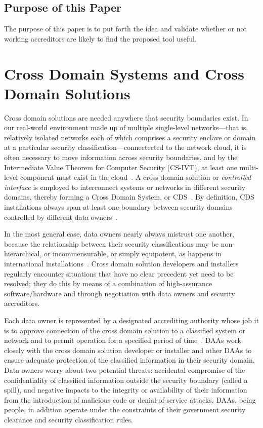 \documentclass{llncs}
\begin{document}
\subsection{Purpose of this Paper}

The purpose of this paper
is to put forth the idea and validate whether or not working accreditors
are likely to find the proposed tool useful.

\section{Cross Domain Systems and Cross Domain Solutions}

Cross domain solutions are needed anywhere that security boundaries exist.
In our real-world environment made up of multiple single-level networks---that is,
relatively isolated networks each of which comprises a security enclave or
domain at a particular security classification---connectected to the
network cloud, it is often necessary to move information across security
boundaries, and by the Intermediate Value Theorem for Computer Security (CS-IVT),
at least one multi-level component must exist in the
cloud~\cite[]{Bell2005b}.  A cross domain solution or
\emph{controlled interface} is employed to interconnect systems or networks
in different security domains, thereby forming a Cross Domain System,
or CDS~\cite{DCID-6/3a}.
By definition, CDS installations always span at least one boundary between
security domains controlled by different data owners~\cite{Loughry2010a}.

In the most general case, data owners nearly always mistrust one another,
because the relationship between their security classifications may be
non-hierarchical, or incommensurable, or simply equipotent, as happens in
international
installations~\cite{TSOL_2.5_CMW}.  Cross domain solution developers and installers regularly
encounter situations that have no clear precedent yet need to be resolved;
they do this by means of a combination of high-assurance
software/hardware and through negotiation with data owners and security accreditors.

Each data owner is represented by a designated accrediting authority
whose job it is to approve connection of the cross domain solution to
a classified system or network and to permit operation for a specified period of
time~\cite{NIST-SP-800-37,NIST-SP-800-53A2,DIACAP,NIST-SP800-53r3}.
DAAs work closely with the cross domain solution developer or installer and other DAAs to ensure
adequate protection of the classified information in their security domain.
Data owners worry about two potential threats: accidental compromise of the confidentiality of
classified information outside the security boundary (called a spill),
and negative impacts to the integrity or availability of their information
from the introduction of malicious code or denial-of-service attacks.  DAAs,
being people, 
in addition operate under the constraints of their government security clearance and
security classification rules.
\end{document}
